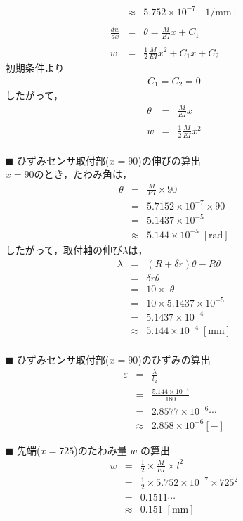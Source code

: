 \documentclass[twocolumn,a4j]{jsarticle}
\begin{document}
\begin{itemize}
\begin{eqnarray*}
        &\approx& 5.752 × 10^{-7} \;\left[\mathrm{1/mm}\right]\\ \\
        \frac{dw}{dx} &=& \theta = \frac{M}{EI} x + C_1\\ \\
        w &=& \frac{1}{2} \frac{M}{EI} x^2 + C_1x + C_2
    \end{eqnarray*}
    初期条件より
    \begin{eqnarray*}
        C_1 = C_2 = 0
    \end{eqnarray*}
    したがって，
    \begin{eqnarray*}
        \theta &=& \frac{M}{EI}x\\ \\
        w &=& \frac{1}{2}\frac{M}{EI}x^2\\
    \end{eqnarray*}
        \item [$\blacksquare$] ひずみセンサ取付部($x=90$)の伸びの算出\\
    $x = 90$のとき，たわみ角は，
    \begin{eqnarray*}
        \theta &=& \frac{M}{EI} × 90\\
        &=& 5.7152 × 10^{-7} × 90\\
        &=& 5.1437 × 10^{-5}\\
        &\approx& 5.144 × 10^{-5} \;\left[\mathrm{rad}\right]
    \end{eqnarray*}
    したがって，取付軸の伸び$\lambda$は，
    \begin{eqnarray*}
        \lambda &=& \left(R+\delta r\right)\theta - R\theta\\
        &=& \delta r \theta\\
        &=& 10 × \;\theta\\
        &=& 10 × 5.1437 × 10^{-5}\\
        &=& 5.1437 × 10^{-4}\\
        &\approx& 5.144 × 10^{-4} \;\left[\mathrm{mm}\right]\\
    \end{eqnarray*}
    \item [$\blacksquare$] ひずみセンサ取付部($x=90$)のひずみの算出
        \begin{eqnarray*}
            \varepsilon &=& \frac{\lambda}{l_2}\\
            &=& \frac{5.144 × 10^{-4}}{180}\\
            &=& 2.8577 ×　10^{-6}\cdots\\
            &\approx& 2.858 × 10^{-6} \left[\mathrm{-}\right]
        \end{eqnarray*}
    \item [$\blacksquare$] 先端($x=725$)のたわみ量 $w$ の算出
    \begin{eqnarray*}
        w &=& \frac{1}{2} × \frac{M}{EI} × l^2\\
        &=& \frac{1}{2} × 5.752 × 10^{-7} × 725^2\\
        &=& 0.1511 \cdots\\
        &\approx& 0.151 \;\left[\mathrm{mm}\right]
    \end{eqnarray*}
\end{itemize}
\end{document}
